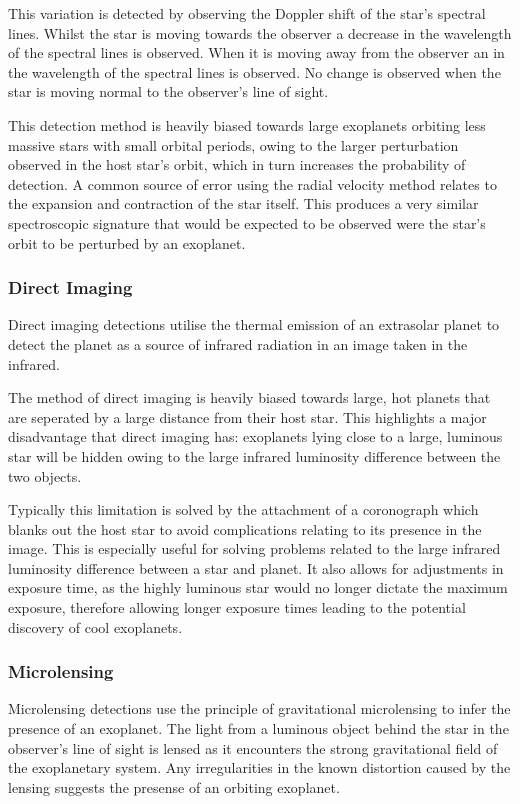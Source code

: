 \documentclass{article}
\begin{document}
This variation is detected by observing the Doppler shift of the star’s spectral lines. Whilst the star is moving towards the observer a decrease in the wavelength of the spectral lines is observed. When it is moving away from the observer an in the wavelength of the spectral lines is observed. No change is observed when the star is moving normal to the observer’s line of sight.


This detection method is heavily biased towards large exoplanets orbiting less massive stars with small orbital periods, owing to the larger perturbation observed in the host star’s orbit, which in turn increases the probability of detection. A common source of error using the radial velocity method relates to the expansion and contraction of the star itself. This produces a very similar spectroscopic signature that would be expected to be observed were the star's orbit to be perturbed by an exoplanet.

\subsubsection{Direct Imaging
}
Direct imaging detections utilise the thermal emission of an extrasolar planet to detect the planet as a source of infrared radiation in an image taken in the infrared. 

The method of direct imaging is heavily biased towards large, hot planets that are seperated by a large distance from their host star. This highlights a major disadvantage that direct imaging has: exoplanets lying close to a large, luminous star will be hidden owing to the large infrared luminosity difference between the two objects.

 

Typically this limitation is solved by the attachment of a coronograph which blanks out the host star to avoid complications relating to its presence in the image. This is especially useful for solving problems related to the large infrared luminosity difference between a star and planet. It also allows for adjustments in exposure time, as the highly luminous star would no longer dictate the maximum exposure, therefore allowing longer exposure times leading to the potential discovery of cool exoplanets. 

\subsubsection{Microlensing
}
Microlensing detections use the principle of gravitational microlensing to infer the presence of an exoplanet. The light from a luminous object behind the star in the observer's line of sight is lensed as it encounters the strong gravitational field of the exoplanetary system. Any irregularities in the known distortion caused by the lensing suggests the presense of an orbiting exoplanet.  
\end{document}
